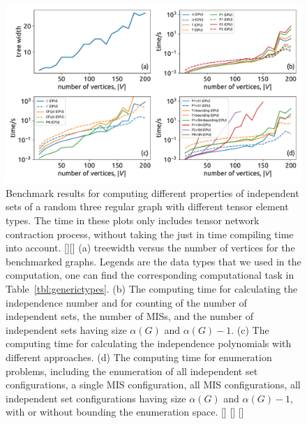 \documentclass[onefignum, onetabnum]{siamart190516}
\newcommand{\<}{\langle}
\renewcommand{\>}{\rangle}
\newcommand{\Tbl}[1]{Table~\ref{#1}}
\newcommand{\red}[1]{[{\bf  \color{red}{ST: #1}}]}
\newcommand{\blue}[1]{[{\bf  \color{blue}{JG: #1}}]}
\begin{document}
\begin{figure} 
    \centering
    \includegraphics[width=\textwidth, trim={0cm 0cm 0cm 0cm}, clip]{figures/fig1.pdf}
    \caption{Benchmark results for computing different properties of independent sets of a random three regular graph with different tensor element types.
    The time in these plots only includes tensor network contraction process, without taking the just in time compiling time into account.
    \red{for each graph size, is there only one graph?}\blue{yes}
    (a) treewidth versus the number of vertices for the benchmarked graphs. 
    Legends are the data types that we used in the computation, one can find the corresponding computational task in \Tbl{tbl:generictypes}.
    (b) The computing time for calculating the independence number and for counting of the number of independent sets, the number of MISs, and the number of independent sets having size $\alpha(G)$ and $\alpha(G)-1$.
    (c) The computing time for calculating the independence polynomials with different approaches.
    (d) The computing time for enumeration problems, including the enumeration of all independent set configurations, a single MIS configuration, all MIS configurations, all independent set configurations having size $\alpha(G)$ and $\alpha(G)-1$,  with or without bounding the enumeration space.
    \red{suggestions for the figure: 1. the legend seems to overlap the lines, especially the large subfigure. Not sure what's a better way to include the legend there. 2. I see you guys don't typically use markers. We typically use markers to distinguish the different lines, as well as using the color. Especially, for some journals, there is a physical non-color copy, so some requires the figures to be understandable without colors.}
    \blue{If we use markers, the data poitns are too dense. I prefer not adding markers, not much people read papers with kindle or on paper.}
    \blue{I used a smaller fontsize, there are still some overlaps. Does it look better (or worse) now?}
    }
    \label{fig:benchmark}
\end{figure}
\end{document}
